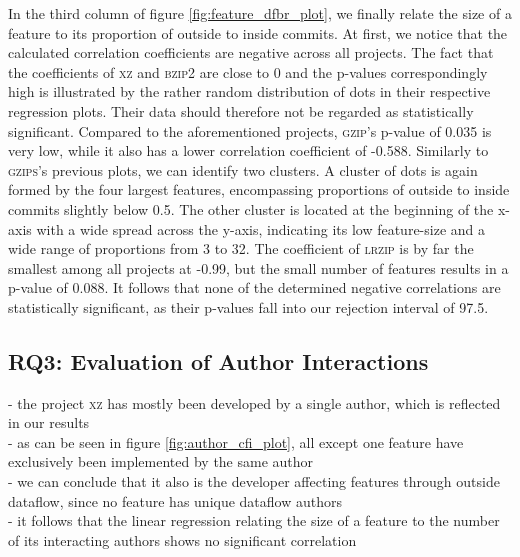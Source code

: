 In the third column of figure \ref{fig:feature_dfbr_plot}, we finally relate the size of a feature to its proportion of outside to inside commits.
At first, we notice that the calculated correlation coefficients are negative across all projects.
The fact that the coefficients of \textsc{xz} and \textsc{bzip2} are close to 0 and the p-values correspondingly high is illustrated by the rather random distribution of dots in their respective regression plots.
Their data should therefore not be regarded as statistically significant.
Compared to the aforementioned projects, \textsc{gzip}'s p-value of 0.035 is very low, while it also has a lower correlation coefficient of -0.588.
Similarly to \textsc{gzips}'s previous plots, we can identify two clusters.
A cluster of dots is again formed by the four largest features, encompassing proportions of outside to inside commits slightly below 0.5.
The other cluster is located at the beginning of the x-axis with a wide spread across the y-axis, indicating its low feature-size and a wide range of proportions from 3 to 32.
The coefficient of \textsc{lrzip} is by far the smallest among all projects at -0.99, but the small number of features results in a p-value of 0.088.
It follows that none of the determined negative correlations are statistically significant, as their p-values fall into our rejection interval of 97.5.





































\subsection*{\textbf{RQ3: Evaluation of Author Interactions}}\label{sec:eval_author_interactions}

- the project \textsc{xz} has mostly been developed by a single author, which is reflected in our results \\
- as can be seen in figure \ref{fig:author_cfi_plot}, all except one feature have exclusively been implemented by the same author \\
- we can conclude that it also is the developer affecting features through outside dataflow, since no feature has unique dataflow authors \\
- it follows that the linear regression relating the size of a feature to the number of its interacting authors shows no significant correlation \\

